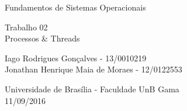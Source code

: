\begin{titlepage}
\begin{center}

	{\LARGE Fundamentos de Sistemas Operacionais}
	\\
	\vspace*{\fill}

	{\LARGE Trabalho 02 \\ \vspace{0.3in} Processos \& Threads}
	\\
	\vspace*{\fill}

	{\large Iago Rodrigues Gonçalves - 13/0010219
	\\ Jonathan Henrique Maia de Moraes - 12/0122553}

	\vspace{1in}

	{\large Universidade de Brasília - Faculdade UnB Gama
	\\ 11/09/2016}
\end{center}
\end{titlepage}
